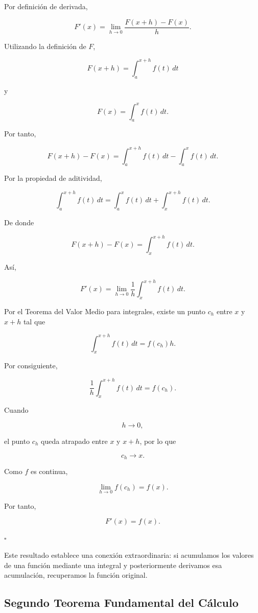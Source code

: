 \documentclass[12pt]{article}
\begin{document}
Por definición de derivada,

\[
F'(x)
=
\lim_{h\to0}
\frac{F(x+h)-F(x)}{h}.
\]

Utilizando la definición de $F$,

\[
F(x+h)
=
\int_a^{x+h}f(t)\,dt
\]

y

\[
F(x)
=
\int_a^x f(t)\,dt.
\]

Por tanto,

\[
F(x+h)-F(x)
=
\int_a^{x+h}f(t)\,dt
-
\int_a^x f(t)\,dt.
\]

Por la propiedad de aditividad,

\[
\int_a^{x+h}f(t)\,dt
=
\int_a^x f(t)\,dt
+
\int_x^{x+h}f(t)\,dt.
\]

De donde

\[
F(x+h)-F(x)
=
\int_x^{x+h}f(t)\,dt.
\]

Así,

\[
F'(x)
=
\lim_{h\to0}
\frac{1}{h}
\int_x^{x+h}f(t)\,dt.
\]

Por el Teorema del Valor Medio para integrales, existe un punto $c_h$
entre $x$ y $x+h$ tal que

\[
\int_x^{x+h}f(t)\,dt
=
f(c_h)h.
\]

Por consiguiente,

\[
\frac{1}{h}
\int_x^{x+h}f(t)\,dt
=
f(c_h).
\]

Cuando

\[
h\to0,
\]

el punto $c_h$ queda atrapado entre $x$ y $x+h$, por lo que

\[
c_h\to x.
\]

Como $f$ es continua,

\[
\lim_{h\to0}f(c_h)=f(x).
\]

Por tanto,

\[
\boxed{
F'(x)=f(x).
}
\]

\hfill$\square$

Este resultado establece una conexión extraordinaria: si acumulamos los
valores de una función mediante una integral y posteriormente derivamos
esa acumulación, recuperamos la función original.

\subsection{Segundo Teorema Fundamental del Cálculo}
\end{document}
